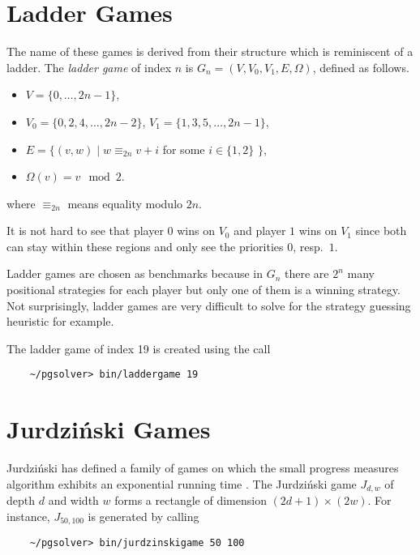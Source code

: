 \section{Ladder Games}
\label{sec:laddergame}

The name of these games is derived from their structure which is reminiscent of a ladder. The
\emph{ladder game} of index $n$ is $G_n = (V,V_0,V_1,E,\Omega)$, defined as follows.
\begin{itemize}
\item $V = \{0,\ldots,2n-1\}$,
\item $V_0 = \{0,2,4,\ldots,2n-2\}$, $V_1 = \{1,3,5,\ldots,2n-1\}$,
\item $E = \{ (v,w) \mid w \equiv_{2n} v+i $ for some $i \in \{1,2\}$ $\}$,
\item $\Omega(v) = v \mod 2$.
\end{itemize}
where $\equiv_{2n}$ means equality modulo $2n$.

It is not hard to see that player $0$ wins on $V_0$ and player $1$ wins on $V_1$ since both can
stay within these regions and only see the priorities $0$, resp.\ $1$.

Ladder games are chosen as benchmarks because in $G_n$ there are $2^n$ many positional strategies for each
player but only one of them is a winning strategy. Not surprisingly, ladder games are very difficult
to solve for the strategy guessing heuristic for example.

The ladder game of index 19 is created using the call
\begin{verbatim}
    ~/pgsolver> bin/laddergame 19
\end{verbatim}



\section{Jurdzi{\'n}ski Games}
\label{sec:jurdgame}

Jurdzi{\'n}ski has defined a family of games on which the small progress measures algorithm
exhibits an exponential running time \cite{Jurdzinski/00}. The Jurdzi{\'n}ski game $J_{d,w}$ of depth 
$d$ and width $w$ forms a rectangle of dimension $(2d+1) \times (2w)$. For instance, $J_{50,100}$
is generated by calling
\begin{verbatim}
    ~/pgsolver> bin/jurdzinskigame 50 100
\end{verbatim}



